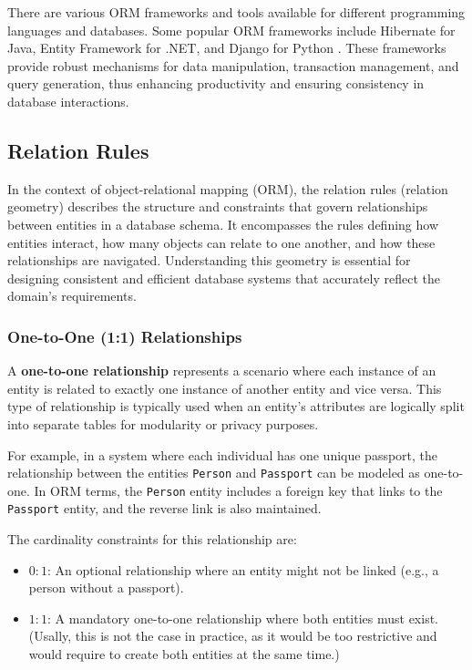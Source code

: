 There are various ORM frameworks and tools available for different programming languages and databases. Some popular ORM frameworks include Hibernate for Java, Entity Framework for .NET, and Django for Python \cite{bernstein2009object}. These frameworks provide robust mechanisms for data manipulation, transaction management, and query generation, thus enhancing productivity and ensuring consistency in database interactions.

\subsection{Relation Rules} \label{sec:relation_rules}

In the context of object-relational mapping (ORM), the relation rules (relation geometry) describes the structure and constraints that govern relationships between entities in a database schema. It encompasses the rules defining how entities interact, how many objects can relate to one another, and how these relationships are navigated. Understanding this geometry is essential for designing consistent and efficient database systems that accurately reflect the domain's requirements.

\subsubsection{One-to-One (1:1) Relationships}
 A \textbf{one-to-one relationship} represents a scenario where each instance of an entity is related to exactly one instance of another entity and vice versa. This type of relationship is typically used when an entity's attributes are logically split into separate tables for modularity or privacy purposes.

For example, in a system where each individual has one unique passport, the relationship between the entities \texttt{Person} and \texttt{Passport} can be modeled as one-to-one. In ORM terms, the \texttt{Person} entity includes a foreign key that links to the \texttt{Passport} entity, and the reverse link is also maintained.

The cardinality constraints for this relationship are:
\begin{itemize}
    \item \(0:1\): An optional relationship where an entity might not be linked (e.g., a person without a passport).
    \item \(1:1\): A mandatory one-to-one relationship where both entities must exist. (Usally, this is not the case in practice, as it would be too restrictive and would require to create both entities at the same time.)
\end{itemize}


